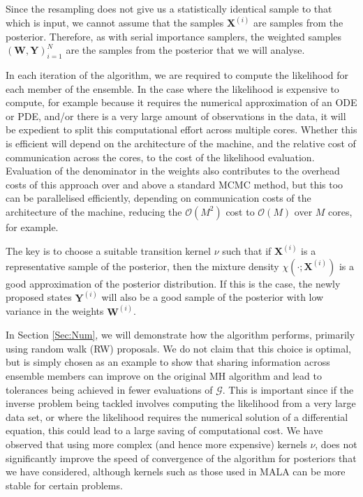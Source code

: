 \documentclass[final]{siamltex}
\newcommand{\G}{\mathcal{G}}
\newcommand{\X}{{\mathbf X}}
\newcommand{\Y}{{\mathbf Y}}
\newcommand{\W}{{\mathbf W}}
\begin{document}
Since the resampling does not give us a statistically identical sample
to that which is input, we cannot assume that the samples $\X^{(i)}$
are samples from the posterior. Therefore, as with serial
importance samplers, the weighted samples
$(\W,\Y)_{i=1}^N$ are the samples from the posterior that
we will analyse.

In each iteration of the algorithm, we are required to compute the
likelihood for each member of the ensemble. In the case where the
likelihood is expensive to compute, for example because it requires
the numerical approximation of an ODE or PDE, and/or there is a very
large amount of observations in the data, it will be expedient to
split this computational effort across multiple cores. Whether this is
efficient will depend on the architecture of the machine, and the
relative cost of communication across the cores, to the cost of the
likelihood evaluation. Evaluation of the denominator in the weights
also contributes to the overhead costs of this approach over and above
a standard MCMC method, but this too can be parallelised efficiently,
depending on communication costs of the architecture of the machine,
reducing the $\mathcal{O}(M^2)$ cost to $\mathcal{O}(M)$ over $M$
cores, for example.

The key is to choose a suitable transition kernel $\nu$ such that
if $\mathbf{X}^{(i)}$ is a representative sample of the posterior,
then the mixture density $\chi(\cdot;\X^{(i)})$ is a good
approximation of the posterior distribution. If this is the case,
the newly proposed states $\Y^{(i)}$ will also be a good sample of the
posterior with low variance in the weights $\W^{(i)}$.

In Section \ref{Sec:Num}, we will demonstrate how the algorithm
performs, primarily using random walk (RW) proposals. We do not claim that this choice is optimal, but
is simply chosen as an example to show that sharing information across
ensemble members can improve on the original MH algorithm and lead to
tolerances being achieved in fewer evaluations of $\G$. This is important since if
the inverse problem being tackled involves computing
the likelihood from a very large data set, or where the likelihood
requires the numerical solution of a differential equation, this could lead to a
large saving of computational cost. We have observed that
using more complex (and hence more expensive) kernels $\nu$, does not
significantly improve the speed of convergence of the algorithm for
posteriors that we have considered, although kernels such as those
used in MALA can be more stable for certain problems\cite{Paul}.
\end{document}
